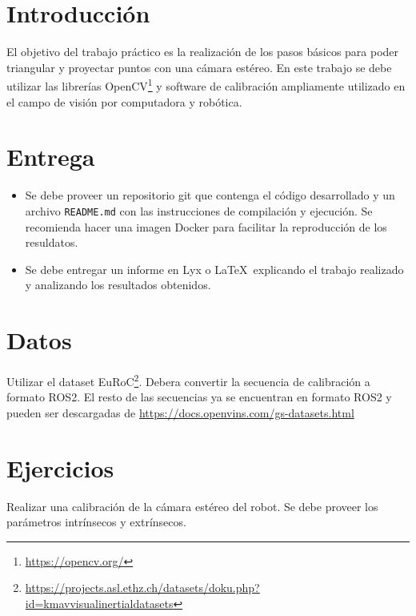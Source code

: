 \documentclass[tp]{lcc}
\begin{document}
\maketitle

\section{Introducción}

El objetivo del trabajo práctico es la realización de los pasos básicos para poder triangular y proyectar puntos con una cámara estéreo. En este trabajo se debe utilizar  las librerías OpenCV\footnote{\url{https://opencv.org/}} y software de calibración ampliamente utilizado en el campo de visión por computadora y robótica.


\section{Entrega}
\begin{itemize}
	\item Se debe proveer un repositorio git que contenga el código desarrollado y un archivo \lstinline{README.md} con las instrucciones de compilación y ejecución. Se recomienda hacer una imagen Docker para facilitar la reproducción de los resuldatos.
    
	\item Se debe entregar un informe en Lyx o \LaTeX\  explicando el trabajo realizado y analizando los resultados obtenidos.
\end{itemize}

\section{Datos}
Utilizar el dataset EuRoC\footnote{\url{https://projects.asl.ethz.ch/datasets/doku.php?id=kmavvisualinertialdatasets}}. Debera convertir la secuencia de calibración a formato ROS2. El resto de las secuencias ya se encuentran en formato ROS2 y pueden ser descargadas de \url{https://docs.openvins.com/gs-datasets.html}


\section{Ejercicios}

\ejercicio Realizar una calibración de la cámara estéreo del robot. Se debe proveer los parámetros intrínsecos y extrínsecos.
\end{document}
